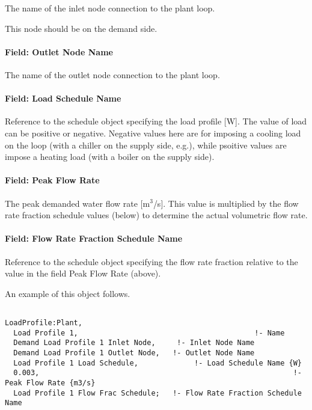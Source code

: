 The name of the inlet node connection to the plant loop.

This node should be on the demand side.

\paragraph{Field: Outlet Node Name}\label{field-outlet-node-name-003}

The name of the outlet node connection to the plant loop.

\paragraph{Field: Load Schedule Name}\label{field-load-schedule-name}

Reference to the schedule object specifying the load profile {[}W{]}.  The value of load can be positive or negative.  Negative values here are for imposing a cooling load on the loop (with a chiller on the supply side, e.g.), while psoitive values are impose a heating load (with a boiler on the supply side).

\paragraph{Field: Peak Flow Rate}\label{field-peak-flow-rate}

The peak demanded water flow rate {[}m\(^{3}\)/s{]}. This value is multiplied by the flow rate fraction schedule values (below) to determine the actual volumetric flow rate.

\paragraph{Field: Flow Rate Fraction Schedule Name}\label{field-flow-rate-fraction-schedule-name}

Reference to the schedule object specifying the flow rate fraction relative to the value in the field Peak Flow Rate (above).

An example of this object follows.

\begin{lstlisting}

LoadProfile:Plant,
  Load Profile 1,                                         !- Name
  Demand Load Profile 1 Inlet Node,     !- Inlet Node Name
  Demand Load Profile 1 Outlet Node,   !- Outlet Node Name
  Load Profile 1 Load Schedule,             !- Load Schedule Name {W}
  0.003,                                                           !- Peak Flow Rate {m3/s}
  Load Profile 1 Flow Frac Schedule;   !- Flow Rate Fraction Schedule Name
\end{lstlisting}

